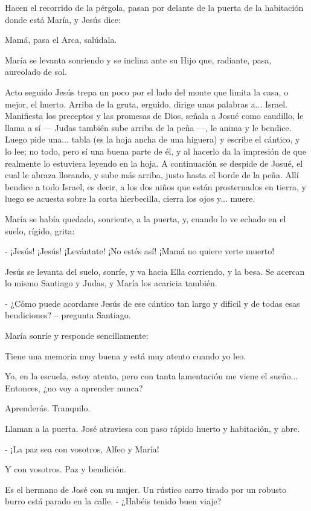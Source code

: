 \documentclass[12pt, twoside, openright]{book} %
\begin{document}
Hacen el recorrido de la pérgola, pasan por delante de la puerta de la habitación donde está María, y Jesús dice: 

Mamá, pasa el Arca, salúdala. 

María se levanta sonriendo y se inclina ante su Hijo que, radiante, pasa, aureolado de sol. 

Acto seguido Jesús trepa un poco por el lado del monte que limita la casa, o mejor, el huerto. Arriba de la gruta, erguido, dirige unas palabras a... Israel. Manifiesta los preceptos y las promesas de Dios, señala a Josué como caudillo, le llama a sí — Judas también sube arriba de la peña —, le anima y le bendice. Luego pide una... tabla (es la hoja ancha de una higuera) y escribe el cántico, y lo lee; no todo, pero sí una buena parte de él, y al hacerlo da la impresión de que realmente lo estuviera leyendo en la hoja. A continuación se despide de Josué, el cual le abraza llorando, y sube más arriba, justo hasta el borde de la peña. Allí bendice a todo Israel, es decir, a los dos niños que están prosternados en tierra, y luego se acuesta sobre la corta hierbecilla, cierra los ojos y... muere. 

María se había quedado, sonriente, a la puerta, y, cuando lo ve echado en el suelo, rígido, grita: 

- ¡Jesús! ¡Jesús! ¡Levántate! ¡No estés así! ¡Mamá no quiere verte muerto! 

Jesús se levanta del suelo, sonríe, y va hacia Ella corriendo, y la besa. Se acercan lo mismo Santiago y Judas, y María los acaricia también. 

- ¿Cómo puede acordarse Jesús de ese cántico tan largo y difícil y de todas esas bendiciones? – pregunta Santiago. 

María sonríe y responde sencillamente: 

Tiene una memoria muy buena y está muy atento cuando yo leo. 

Yo, en la escuela, estoy atento, pero con tanta lamentación me viene el sueño... Entonces, ¿no voy a aprender nunca? 

Aprenderás. Tranquilo. 

Llaman a la puerta. José atraviesa con paso rápido huerto y habitación, y abre. 

- ¡La paz sea con vosotros, Alfeo y María! 

Y con vosotros. Paz y bendición. 

Es el hermano de José con su mujer. Un rústico carro tirado por un robusto burro está parado en la calle. - ¿Habéis tenido buen viaje? 
\end{document}
